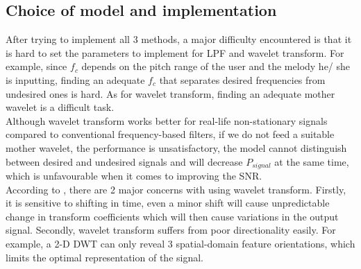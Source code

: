 \subsection{Choice of model and implementation}
After trying to implement all 3 methods, a major difficulty encountered is that it is hard to set the parameters to 
implement for LPF and wavelet transform.
For example, since $f_c$ depends on the pitch range of the user and the melody he/ she
is inputting, finding an adequate $f_c$ that separates desired frequencies from undesired ones is hard.
As for wavelet transform, finding an adequate mother wavelet is a difficult task.\\
Although wavelet transform works better for real-life non-stationary signals compared to conventional frequency-based filters, if we
do not feed a suitable mother wavelet, the performance is unsatisfactory, the model cannot distinguish between desired and undesired 
signals and will decrease $P_{signal}$ at the same time, which is unfavourable when it comes to improving the SNR.\\
According to \cite{complexwt}, there are 2 major concerns with using wavelet transform. 
Firstly, it is sensitive to shifting in time, even a minor shift will cause unpredictable change in transform coefficients which will 
then cause variations in the output signal. Secondly, wavelet transform suffers from poor directionality easily. For example, 
a 2-D DWT can only reveal 3 spatial-domain feature orientations, which limits the optimal representation of the signal. 

